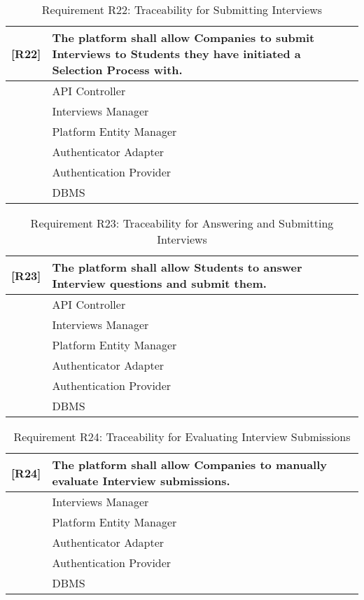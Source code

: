 \begin{table}[H]
    \centering
    \begin{tabular}{|p{1cm}|p{14cm}|}
    \hline
    \textbf{[R22]} & \textbf{The platform shall allow Companies to submit Interviews to Students they have initiated a Selection Process with.} \\ \hline
    [C1] & API Controller \\ \hline
    [C6] & Interviews Manager \\ \hline
    [C10] & Platform Entity Manager \\ \hline
    [C11] & Authenticator Adapter \\ \hline
    [E3] & Authentication Provider \\ \hline
    [E4] & DBMS \\ \hline
    \end{tabular}
    \caption{Requirement R22: Traceability for Submitting Interviews}
    \label{tab:RT22}
\end{table}

\begin{table}[H]
    \centering
    \begin{tabular}{|p{1cm}|p{14cm}|}
    \hline
    \textbf{[R23]} & \textbf{The platform shall allow Students to answer Interview questions and submit them.} \\ \hline
    [C1] & API Controller \\ \hline
    [C6] & Interviews Manager \\ \hline
    [C10] & Platform Entity Manager \\ \hline
    [C11] & Authenticator Adapter \\ \hline
    [E3] & Authentication Provider \\ \hline
    [E4] & DBMS \\ \hline
    \end{tabular}
    \caption{Requirement R23: Traceability for Answering and Submitting Interviews}
    \label{tab:RT23}
\end{table}

\begin{table}[H]
    \centering
    \begin{tabular}{|p{1cm}|p{14cm}|}
    \hline
    \textbf{[R24]} & \textbf{The platform shall allow Companies to manually evaluate Interview submissions.} \\ \hline
    [C6] & Interviews Manager \\ \hline
    [C10] & Platform Entity Manager \\ \hline
    [C11] & Authenticator Adapter \\ \hline
    [E3] & Authentication Provider \\ \hline
    [E4] & DBMS \\ \hline
    \end{tabular}
    \caption{Requirement R24: Traceability for Evaluating Interview Submissions}
    \label{tab:RT24}
\end{table}


